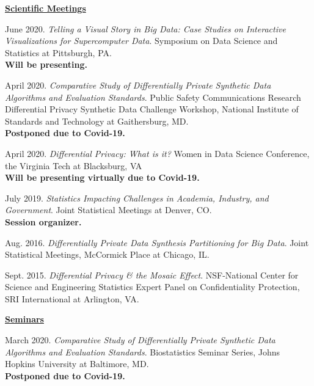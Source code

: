 \documentclass[11pt, letterpaper, roman]{moderncv} %
\begin{document}
\underline{\textbf{\large Scientific Meetings}}\normalsize
\vspace{6pt}
\begin{etaremune}[topsep=0pt, itemsep=6pt, partopsep=0pt, parsep=0pt]
  \item June 2020. \textit{Telling a Visual Story in Big Data: Case Studies on Interactive Visualizations for Supercomputer Data}. Symposium on Data Science and Statistics at Pittsburgh, PA.\\
  \textbf{Will be presenting.}
  
    \item April 2020. \textit{Comparative Study of Differentially Private Synthetic Data Algorithms and Evaluation Standards}. Public Safety Communications Research Differential Privacy Synthetic Data Challenge Workshop, National Institute of Standards and Technology at Gaithersburg, MD.\\
  \textbf{Postponed due to Covid-19.}
  
    \item April 2020. \textit{Differential Privacy: What is it?} Women in Data Science Conference, the Virginia Tech at Blacksburg, VA\\
  \textbf{Will be presenting virtually due to Covid-19.}

  \item July 2019. \textit{Statistics Impacting Challenges in Academia, Industry, and Government}. Joint Statistical Meetings at Denver, CO.\\
  \textbf{Session organizer.}

  \item Aug. 2016. \textit{Differentially Private Data Synthesis Partitioning for Big Data}. Joint Statistical Meetings, McCormick Place at Chicago, IL.

  \item Sept. 2015. \textit{Differential Privacy \& the Mosaic Effect}. NSF-National Center for Science and Engineering Statistics Expert Panel on Confidentiality Protection, SRI International at Arlington, VA.

\vspace{5pt}
\hspace{-0.30in}\underline{\textbf{\large Seminars}}\normalsize
  \item March 2020. \textit{Comparative Study of Differentially Private Synthetic Data Algorithms and Evaluation Standards}. Biostatistics Seminar Series, Johns Hopkins University at Baltimore, MD.\\
  \textbf{Postponed due to Covid-19.}
  

\end{etaremune}
\end{document}
